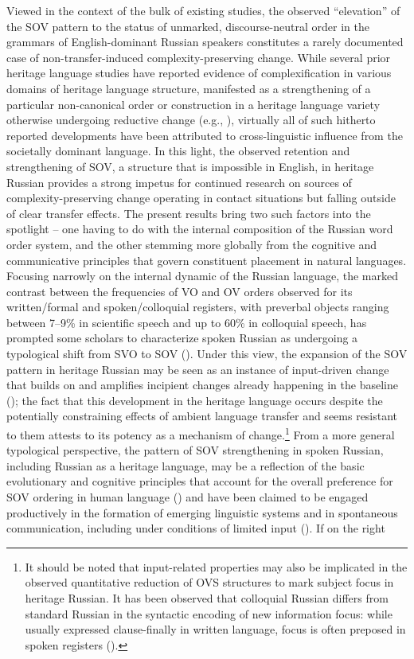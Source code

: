 \documentclass[output=paper]{langscibook}
\begin{document}
Viewed in the context of the bulk of existing studies, the observed “elevation” of the SOV pattern to the status of unmarked, discourse-neutral order in the grammars of English-dominant Russian speakers constitutes a rarely documented case of non-transfer-induced complexity-preserving change. While several prior heritage language studies have reported evidence of complexification in various domains of heritage language structure, manifested as a strengthening of a particular non-canonical order or construction in a heritage language variety otherwise undergoing reductive change (e.g., \citealt{AalberseMoro2014, AalberseZhouAndringa2017, BrehmerUsanova2015, vanOschSleeman2018Subject}), virtually all of such hitherto reported developments have been attributed to cross-linguistic influence from the societally dominant language. In this light, the observed retention and strengthening of SOV, a structure that is impossible in English, in heritage Russian provides a strong impetus for continued research on sources of complexity-preserving change operating in contact situations but falling outside of clear transfer effects. The present results bring two such factors into the spotlight – one having to do with the internal composition of the Russian word order system, and the other stemming more globally from the cognitive and communicative principles that govern constituent placement in natural languages. Focusing narrowly on the internal dynamic of the Russian language, the marked contrast between the frequencies of VO and OV orders observed for its written/formal and spoken/colloquial registers, with preverbal objects ranging between 7--9\% in scientific speech and up to 60\% in colloquial speech, has prompted some scholars to characterize spoken Russian as undergoing a typological shift from SVO to SOV (\citealt{Slioussar2007}). Under this view, the expansion of the SOV pattern in heritage Russian may be seen as an instance of input-driven change that builds on and amplifies incipient changes already happening in the baseline (\citealt{Polinsky2018}); the fact that this development in the heritage language occurs despite the potentially constraining effects of ambient language transfer and seems resistant to them attests to its potency as a mechanism of change.\footnote{It should be noted that input-related properties may also be implicated in the observed quantitative reduction of OVS structures to mark subject focus in heritage Russian. It has been observed that colloquial Russian differs from standard Russian in the syntactic encoding of new information focus: while usually expressed clause-finally in written language, focus is often preposed in spoken registers (\citealt{KrylovaKhavronina1986, Yokoyama1986}).} From a more general typological perspective, the pattern of SOV strengthening in spoken Russian, including Russian as a heritage language, may be a reflection of the basic evolutionary and cognitive principles that account for the overall preference for SOV ordering in human language (\citealt{Dryer2013Order, Newmeyer2000}) and have been claimed to be engaged productively in the formation of emerging linguistic systems and in spontaneous communication, including under conditions of limited input (\citealt{Goldin-Meadow2003, NapoliSutton-Spence2014}). If on the right 
\end{document}
